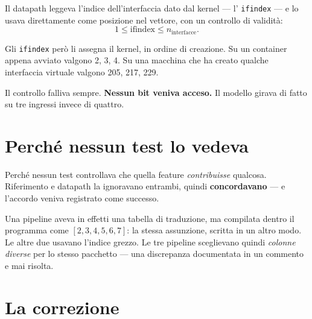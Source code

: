 \documentclass[11pt,a4paper,oneside]{report}
\begin{document}
Il datapath leggeva l'indice dell'interfaccia dato dal kernel --- l'
\texttt{ifindex} --- e lo usava direttamente come posizione nel vettore, con un
controllo di validità:
\[
  1 \le \text{ifindex} \le n_{\text{interfacce}} .
\]

Gli \texttt{ifindex} però li assegna il kernel, in ordine di creazione. Su un
container appena avviato valgono 2, 3, 4. Su una macchina che ha creato qualche
interfaccia virtuale valgono 205, 217, 229.

Il controllo falliva sempre. \textbf{Nessun bit veniva acceso.} Il modello
girava di fatto su tre ingressi invece di quattro.

\begin{center}
\end{center}

\section{Perché nessun test lo vedeva}

Perché nessun test controllava che quella feature \emph{contribuisse} qualcosa.
Riferimento e datapath la ignoravano entrambi, quindi \textbf{concordavano} --- e
l'accordo veniva registrato come successo.

Una pipeline aveva in effetti una tabella di traduzione, ma compilata dentro il
programma come $[2,3,4,5,6,7]$: la stessa assunzione, scritta in un altro modo.
Le altre due usavano l'indice grezzo. Le tre pipeline sceglievano quindi
\emph{colonne diverse} per lo stesso pacchetto --- una discrepanza documentata in
un commento e mai risolta.

\section{La correzione}
\end{document}
